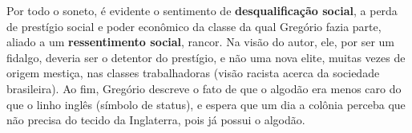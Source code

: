 \documentclass[12pt]{book}
\begin{document}
		\par Por todo o soneto, é evidente o sentimento de \textbf{desqualificação social}, a perda de prestígio social e poder econômico da classe da qual Gregório fazia parte, aliado a um \textbf{ressentimento social}, rancor. Na visão do autor, ele, por ser um fidalgo, deveria ser o detentor do prestígio, e não uma nova elite, muitas vezes de origem mestiça, nas classes trabalhadoras (visão racista acerca da sociedade brasileira). Ao fim, Gregório descreve o fato de que o algodão era menos caro do que o linho inglês (símbolo de status), e espera que um dia a colônia perceba que não precisa do tecido da Inglaterra, pois já possui o algodão.
		\settowidth{\versewidth}{Quem mais limpo se faz, tem mais carepa;}
\end{document}
